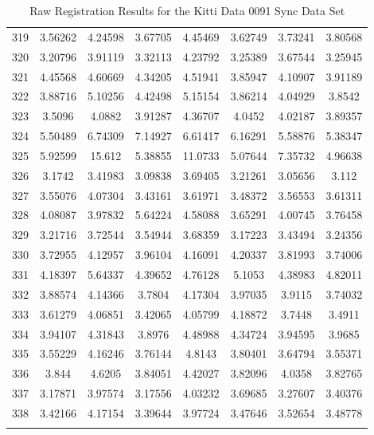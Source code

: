 \begin{center}
\begin{longtable}{cccccccc}
319 & 3.56262 & 4.24598 & 3.67705 & 4.45469 & 3.62749 & 3.73241 & 3.80568\\
320 & 3.20796 & 3.91119 & 3.32113 & 4.23792 & 3.25389 & 3.67544 & 3.25945\\
321 & 4.45568 & 4.60669 & 4.34205 & 4.51941 & 3.85947 & 4.10907 & 3.91189\\
322 & 3.88716 & 5.10256 & 4.42498 & 5.15154 & 3.86214 & 4.04929 & 3.8542\\
323 & 3.5096 & 4.0882 & 3.91287 & 4.36707 & 4.0452 & 4.02187 & 3.89357\\
324 & 5.50489 & 6.74309 & 7.14927 & 6.61417 & 6.16291 & 5.58876 & 5.38347\\
325 & 5.92599 & 15.612 & 5.38855 & 11.0733 & 5.07644 & 7.35732 & 4.96638\\
326 & 3.1742 & 3.41983 & 3.09838 & 3.69405 & 3.21261 & 3.05656 & 3.112\\
327 & 3.55076 & 4.07304 & 3.43161 & 3.61971 & 3.48372 & 3.56553 & 3.61311\\
328 & 4.08087 & 3.97832 & 5.64224 & 4.58088 & 3.65291 & 4.00745 & 3.76458\\
329 & 3.21716 & 3.72544 & 3.54944 & 3.68359 & 3.17223 & 3.43494 & 3.24356\\
330 & 3.72955 & 4.12957 & 3.96104 & 4.16091 & 4.20337 & 3.81993 & 3.74006\\
331 & 4.18397 & 5.64337 & 4.39652 & 4.76128 & 5.1053 & 4.38983 & 4.82011\\
332 & 3.88574 & 4.14366 & 3.7804 & 4.17304 & 3.97035 & 3.9115 & 3.74032\\
333 & 3.61279 & 4.06851 & 3.42065 & 4.05799 & 4.18872 & 3.7448 & 3.4911\\
334 & 3.94107 & 4.31843 & 3.8976 & 4.48988 & 4.34724 & 3.94595 & 3.9685\\
335 & 3.55229 & 4.16246 & 3.76144 & 4.8143 & 3.80401 & 3.64794 & 3.55371\\
336 & 3.844 & 4.6205 & 3.84051 & 4.42027 & 3.82096 & 4.0358 & 3.82765\\
337 & 3.17871 & 3.97574 & 3.17556 & 4.03232 & 3.69685 & 3.27607 & 3.40376\\
338 & 3.42166 & 4.17154 & 3.39644 & 3.97724 & 3.47646 & 3.52654 & 3.48778\\
\caption{Raw Registration Results for the Kitti Data 0091 Sync Data Set}
\label{tab:kittidata0091syncFULL}
\end{longtable}
\end{center} 



